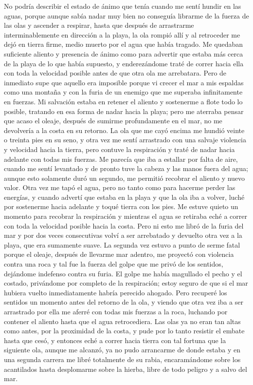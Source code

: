 \documentclass{novela}
\begin{document}
    No podría describir el estado de ánimo que tenía cuando me sentí hundir en las aguas, porque aunque sabía nadar muy bien no conseguía librarme de la fuerza de las olas y ascender a respirar, hasta que después de arrastrarme interminablemente en dirección a la playa, la ola rompió allí y al retroceder me dejó en tierra firme, medio muerto por el agua que había tragado. Me quedaban suficiente aliento y presencia de ánimo como para advertir que estaba más cerca de la playa de lo que había supuesto, y enderezándome traté de correr hacia ella con toda la velocidad posible antes de que otra ola me arrebatara. Pero de inmediato supe que aquello era imposible porque vi crecer el mar a mis espaldas como una montaña y con la furia de un enemigo que me superaba infinitamente en fuerzas. Mi salvación estaba en retener el aliento y sostenerme a flote todo lo posible, tratando en esa forma de nadar hacia la playa; pero me aterraba pensar que acaso el oleaje, después de sumirme profundamente en el mar, no me devolvería a la costa en su retorno.
    La ola que me cayó encima me hundió veinte o treinta pies en su seno, y otra vez me sentí arrastrado con una salvaje violencia y velocidad hacia la tierra, pero contuve la respiración y traté de nadar hacia adelante con todas mis fuerzas. Me parecía que iba a estallar por falta de aire, cuando me sentí levantado y de pronto tuve la cabeza y las manos fuera del agua; aunque esto solamente duró un segundo, me permitió recobrar el aliento y nuevo valor. Otra vez me tapó el agua, pero no tanto como para hacerme perder las energías, y cuando advertí que estaba en la playa y que la ola iba a volver, luché por sostenerme hacia adelante y toqué tierra con los pies. Me estuve quieto un momento para recobrar la respiración y mientras el agua se retiraba eché a correr con toda la velocidad posible hacia la costa. Pero ni esto me libró de la furia del mar y por dos veces consecutivas volví a ser arrebatado y devuelto otra vez a la playa, que era sumamente suave.
    La segunda vez estuvo a punto de serme fatal porque el oleaje, después de llevarme mar adentro, me proyectó con violencia contra una roca y tal fue la fuerza del golpe que me privó de los sentidos, dejándome indefenso contra su furia. El golpe me había magullado el pecho y el costado, privándome por completo de la respiración; estoy seguro de que si el mar hubiera vuelto inmediatamente habría perecido ahogado. Pero recuperé los sentidos un momento antes del retorno de la ola, y viendo que otra vez iba a ser arrastrado por ella me aferré con todas mis fuerzas a la roca, luchando por contener el aliento hasta que el agua retrocediera. Las olas ya no eran tan altas como antes, por la proximidad de la costa, y pude por lo tanto resistir el embate hasta que cesó, y entonces eché a correr hacia tierra con tal fortuna que la siguiente ola, aunque me alcanzó, ya no pudo arrancarme de donde estaba y en una segunda carrera me libré totalmente de su rabia, encaramándome sobre los acantilados hasta desplomarme sobre la hierba, libre de todo peligro y a salvo del mar.
\end{document}
